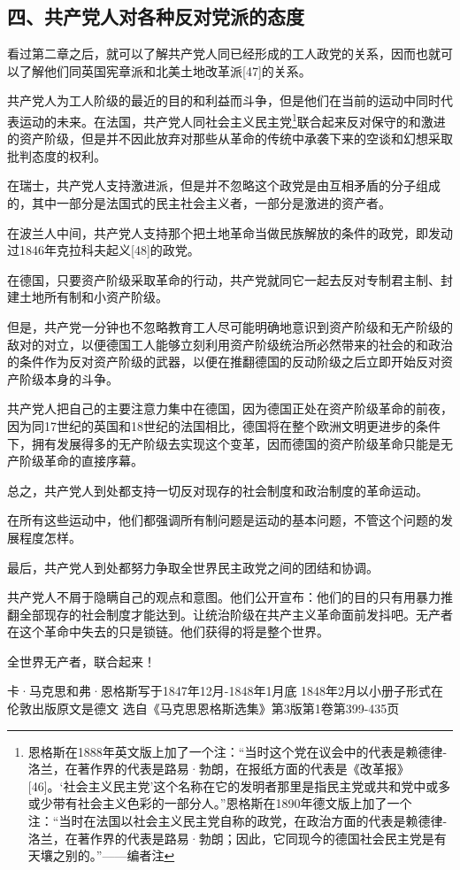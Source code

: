 \documentclass[UTF8,zihao=-4,a4paper]{ctexart}
\begin{document}
\subsection*{四、共产党人对各种反对党派的态度}
看过第二章之后，就可以了解共产党人同已经形成的工人政党的关系，因而也就可以了解他们同英国宪章派和北美土地改革派[47]的关系。\par
共产党人为工人阶级的最近的目的和利益而斗争，但是他们在当前的运动中同时代表运动的未来。在法国，共产党人同社会主义民主党\footnote{恩格斯在1888年英文版上加了一个注：“当时这个党在议会中的代表是赖德律-洛兰，在著作界的代表是路易·勃朗，在报纸方面的代表是《改革报》[46]。‘社会主义民主党’这个名称在它的发明者那里是指民主党或共和党中或多或少带有社会主义色彩的一部分人。”恩格斯在1890年德文版上加了一个注：“当时在法国以社会主义民主党自称的政党，在政治方面的代表是赖德律-洛兰，在著作界的代表是路易·勃朗；因此，它同现今的德国社会民主党是有天壤之别的。”——编者注}联合起来反对保守的和激进的资产阶级，但是并不因此放弃对那些从革命的传统中承袭下来的空谈和幻想采取批判态度的权利。\par
在瑞士，共产党人支持激进派，但是并不忽略这个政党是由互相矛盾的分子组成的，其中一部分是法国式的民主社会主义者，一部分是激进的资产者。\par
在波兰人中间，共产党人支持那个把土地革命当做民族解放的条件的政党，即发动过1846年克拉科夫起义[48]的政党。\par
在德国，只要资产阶级采取革命的行动，共产党就同它一起去反对专制君主制、封建土地所有制和小资产阶级。\par
但是，共产党一分钟也不忽略教育工人尽可能明确地意识到资产阶级和无产阶级的敌对的对立，以便德国工人能够立刻利用资产阶级统治所必然带来的社会的和政治的条件作为反对资产阶级的武器，以便在推翻德国的反动阶级之后立即开始反对资产阶级本身的斗争。\par
共产党人把自己的主要注意力集中在德国，因为德国正处在资产阶级革命的前夜，因为同17世纪的英国和18世纪的法国相比，德国将在整个欧洲文明更进步的条件下，拥有发展得多的无产阶级去实现这个变革，因而德国的资产阶级革命只能是无产阶级革命的直接序幕。\par
总之，共产党人到处都支持一切反对现存的社会制度和政治制度的革命运动。\par
在所有这些运动中，他们都强调所有制问题是运动的基本问题，不管这个问题的发展程度怎样。\par
最后，共产党人到处都努力争取全世界民主政党之间的团结和协调。\par
共产党人不屑于隐瞒自己的观点和意图。他们公开宣布：他们的目的只有用暴力推翻全部现存的社会制度才能达到。让统治阶级在共产主义革命面前发抖吧。无产者在这个革命中失去的只是锁链。他们获得的将是整个世界。\par
全世界无产者，联合起来！\par
卡·马克思和弗·恩格斯写于1847年12月-1848年1月底 
 1848年2月以小册子形式在伦敦出版原文是德文 
 选自《马克思恩格斯选集》第3版第1卷第399-435页\par
\end{document}

